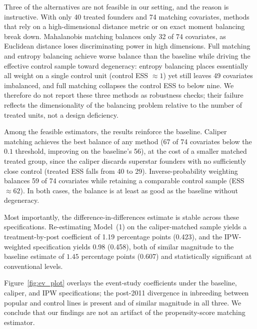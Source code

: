 \documentclass[12pt,letterpaper]{article}
\begin{document}
Three of the alternatives are not feasible in our setting, and the reason is instructive. With only 40 treated founders and 74 matching covariates, methods that rely on a high-dimensional distance metric or on exact moment balancing break down. Mahalanobis matching balances only 32 of 74 covariates, as Euclidean distance loses discriminating power in high dimensions. Full matching and entropy balancing achieve worse balance than the baseline while driving the effective control sample toward degeneracy: entropy balancing places essentially all weight on a single control unit (control ESS $\approx 1$) yet still leaves 49 covariates imbalanced, and full matching collapses the control ESS to below nine. We therefore do not report these three methods as robustness checks; their failure reflects the dimensionality of the balancing problem relative to the number of treated units, not a design deficiency.
 
Among the feasible estimators, the results reinforce the baseline. Caliper matching achieves the best balance of any method (67 of 74 covariates below the $0.1$ threshold, improving on the baseline's 56), at the cost of a smaller matched treated group, since the caliper discards superstar founders with no sufficiently close control (treated ESS falls from 40 to 29). Inverse-probability weighting balances 59 of 74 covariates while retaining a comparable control sample (ESS $\approx 62$). In both cases, the balance is at least as good as the baseline without degeneracy.
 
Most importantly, the difference-in-differences estimate is stable across these specifications. Re-estimating Model~(1) on the caliper-matched sample yields a treatment-by-post coefficient of 1.19 percentage points (0.423), and the IPW-weighted specification yields 0.98 (0.458), both of similar magnitude to the baseline estimate of $1.45$ percentage points (0.607) and statistically significant at conventional levels.

Figure~\ref{fig:ev_plot} overlays the event-study coefficients under the baseline, caliper, and IPW specifications; the post-2011 divergence in inbreeding between popular and control lines is present and of similar magnitude in all three. We conclude that our findings are not an artifact of the propensity-score matching estimator.
 
\end{document}
